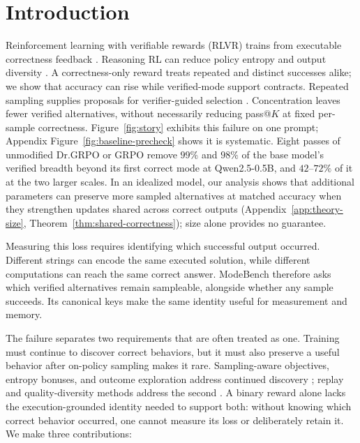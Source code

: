 \documentclass{article}
\newcommand{\1}{\mathbf 1}
\theoremstyle{remark}
\theoremstyle{definition}
\theoremstyle{plain}
\begin{document}
\section{Introduction}
\label{sec:introduction}

Reinforcement learning with verifiable rewards (RLVR) trains from executable
correctness feedback \citep{guo2025deepseekr1}. Reasoning RL can reduce policy
entropy and output diversity \citep{cui2025entropy,dang2025diversity}.
A correctness-only reward treats repeated and distinct successes alike; we
show that accuracy can rise while verified-mode support contracts.
Repeated sampling supplies proposals for verifier-guided selection
\citep{brown2024monkeys,snell2024testtime,cobbe2021training,lightman2023lets}.
Concentration leaves fewer verified alternatives, without necessarily reducing
pass@$K$ at fixed per-sample correctness.
Figure~\ref{fig:story} exhibits this failure on one prompt;
Appendix Figure~\ref{fig:baseline-precheck} shows it is systematic. Eight passes of
unmodified Dr.GRPO or GRPO remove $99\%$ and $98\%$ of the base model's
verified breadth beyond its first correct mode at Qwen2.5-0.5B, and
$42$--$72\%$ of it at the two larger scales.
In an idealized model, our analysis shows that additional parameters can
preserve more sampled alternatives at matched accuracy when they strengthen
updates shared across correct outputs
(Appendix~\ref{app:theory-size}, Theorem~\ref{thm:shared-correctness});
size alone provides no guarantee.

Measuring this loss requires identifying which successful output occurred.
Different strings can encode the same executed solution, while different
computations can reach the same correct answer. ModeBench therefore asks which
verified alternatives remain sampleable, alongside whether any sample succeeds.
Its canonical keys make the same identity useful for measurement and memory.

The failure separates two requirements that are often treated as one. Training
must continue to discover correct behaviors, but it must also preserve a useful
behavior after on-policy sampling makes it rare. Sampling-aware objectives,
entropy bonuses, and outcome exploration address continued discovery
\citep{cheng2025exploration,song2025outcome,chen2025passktraining}; replay and
quality-diversity methods address the second
\citep{lin1992selfimproving,mnih2015human,ecoffet2021return,
mouret2015illuminating}. A binary reward alone lacks the execution-grounded identity needed to
support both: without knowing which correct behavior occurred, one cannot
measure its loss or deliberately retain it. We make three contributions:
\end{document}
